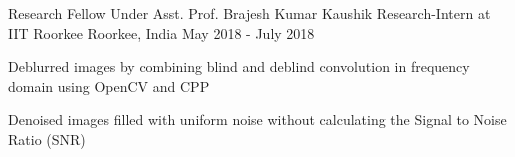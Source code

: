 \begin{cventries}
  \cventry
    {Research Fellow Under Asst. Prof. Brajesh Kumar Kaushik }
    {Research-Intern at IIT Roorkee}
    {Roorkee, India}
    {May 2018 - July 2018}
    {
      \begin{cvitems}
        \item {Deblurred images by combining blind and deblind convolution in frequency domain using OpenCV and CPP}
        \item {Denoised images filled with uniform noise without calculating the Signal to Noise Ratio (SNR)}
      \end{cvitems}
    }
  
\end{cventries}
